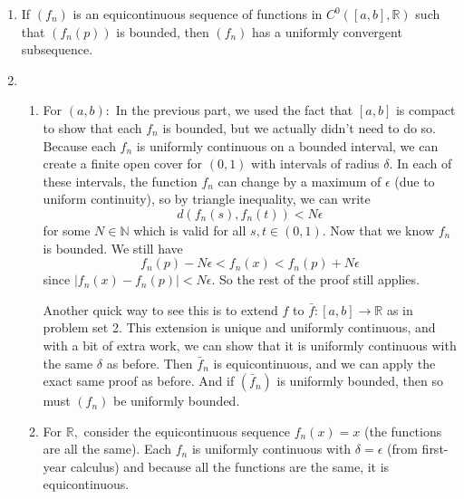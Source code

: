 \documentclass{article}
\numberwithin{equation}{section}
\begin{document}
\begin{enumerate}
\begin{enumerate}[label=(\alph*)]
        \item If $(f_n)$ is an equicontinuous sequence of functions in $C^0([a,b],\mathbb{R})$ such that $(f_n(p))$ is bounded, then $(f_n)$ has a uniformly convergent subsequence.
        \item \begin{enumerate}
            \item For $(a,b):$ In the previous part, we used the fact that $[a,b]$ is compact to show that each $f_n$ is bounded, but we actually didn't need to do so. Because each $f_n$ is uniformly continuous on a bounded interval, we can create a finite open cover for $(0,1)$ with intervals of radius $\delta.$ In each of these intervals, the function $f_n$ can change by a maximum of $\epsilon$ (due to uniform continuity), so by triangle inequality, we can write 
            \begin{equation}
                d(f_n(s),f_n(t)) < N\epsilon
            \end{equation}
            for some $N \in \mathbb{N}$ which is valid for all $s,t\in (0,1).$ Now that we know $f_n$ is bounded. We still have 
            \begin{equation}
                f_n(p) - N\epsilon < f_n(x) < f_n(p) + N\epsilon
            \end{equation}
            since $|f_n(x)-f_n(p)|<N\epsilon.$ So the rest of the proof still applies.

            Another quick way to see this is to extend $f$ to $\bar{f}:[a,b]\to \mathbb{R}$ as in problem set 2. This extension is unique and uniformly continuous, and with a bit of extra work, we can show that it is uniformly continuous with the same $\delta$ as before. Then $\bar{f}_n$ is equicontinuous, and we can apply the exact same proof as before. And if $(\bar{f}_n)$ is uniformly bounded, then so must $(f_n)$ be uniformly bounded.
            \item For $\mathbb{R},$ consider the equicontinuous sequence $f_n(x) = x$ (the functions are all the same). Each $f_n$ is uniformly continuous with $\delta = \epsilon$ (from first-year calculus) and because all the functions are the same, it is equicontinuous.
            

\end{enumerate}
\end{enumerate}
\end{enumerate}
\end{document}
